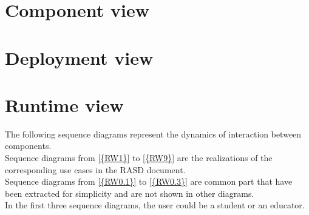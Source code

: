 \section{Component view}
\begin{adjustbox}{
        max size={\textwidth}{},
        caption={Component view diagram},
        label={fig:Component view diagram},
        figure=H}
    \centering
\end{adjustbox}
\pagebreak

\section{Deployment view}
\begin{adjustbox}{
        max size={\textwidth}{},
        caption={Deployment view diagram},
        label={fig:Deployment view diagram},
        figure=H}
    \centering
\end{adjustbox}
\pagebreak

\section{Runtime view}
The following sequence diagrams represent the dynamics of interaction between components.\\
Sequence diagrams from \ref{{RW1}} to \ref{{RW9}} are the realizations of the corresponding use cases in the RASD document.\\
Sequence diagrams from \ref{{RW0.1}} to \ref{{RW0.3}} are common part that have been extracted for simplicity and are not shown in other diagrams.\\
In the first three sequence diagrams, the user could be a student or an educator.

